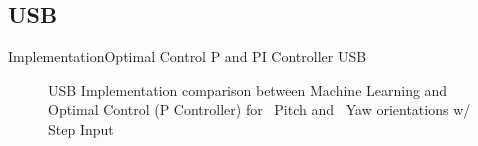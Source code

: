 \documentclass{beamer}
\begin{document}
\subsection{USB}
\begin{frame}{Implementation}{Optimal Control P and PI Controller USB}
    \begin{figure}
      \centering
      \caption{USB Implementation comparison between Machine Learning and Optimal Control (P Controller) for ~Pitch and ~Yaw orientations w/ Step Input}
      \label{fig:PvPI_USB}
    \end{figure}
\end{frame}
\end{document}

